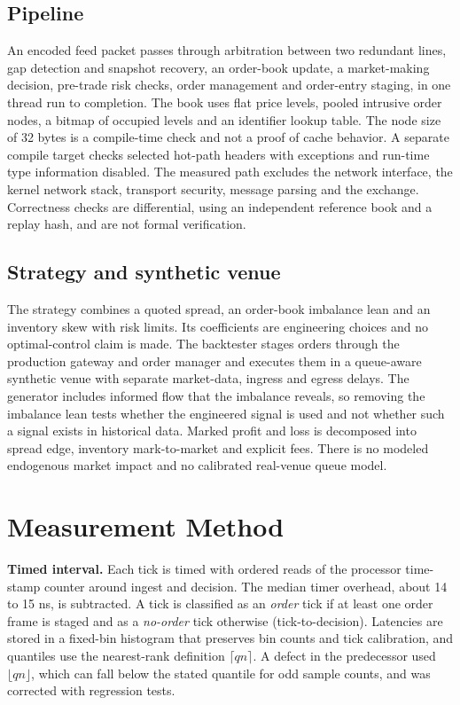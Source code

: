 \documentclass{ieeeaccess}
\begin{document}
\subsection{Pipeline}
An encoded feed packet passes through arbitration between two redundant lines, gap detection and snapshot recovery, an order-book update, a market-making decision, pre-trade risk checks, order management and order-entry staging, in one thread run to completion. The book uses flat price levels, pooled intrusive order nodes, a bitmap of occupied levels and an identifier lookup table. The node size of 32 bytes is a compile-time check and not a proof of cache behavior. A separate compile target checks selected hot-path headers with exceptions and run-time type information disabled. The measured path excludes the network interface, the kernel network stack, transport security, message parsing and the exchange. Correctness checks are differential, using an independent reference book and a replay hash, and are not formal verification.

\subsection{Strategy and synthetic venue}
The strategy combines a quoted spread, an order-book imbalance lean and an inventory skew with risk limits. Its coefficients are engineering choices and no optimal-control claim is made. The backtester stages orders through the production gateway and order manager and executes them in a queue-aware synthetic venue with separate market-data, ingress and egress delays. The generator includes informed flow that the imbalance reveals, so removing the imbalance lean tests whether the engineered signal is used and not whether such a signal exists in historical data. Marked profit and loss is decomposed into spread edge, inventory mark-to-market and explicit fees. There is no modeled endogenous market impact and no calibrated real-venue queue model.

\section{Measurement Method}
\label{sec:method}
\textbf{Timed interval.} Each tick is timed with ordered reads of the processor time-stamp counter around ingest and decision. The median timer overhead, about 14 to 15 ns, is subtracted. A tick is classified as an \emph{order} tick if at least one order frame is staged and as a \emph{no-order} tick otherwise (tick-to-decision). Latencies are stored in a fixed-bin histogram that preserves bin counts and tick calibration, and quantiles use the nearest-rank definition $\lceil qn\rceil$. A defect in the predecessor used $\lfloor qn\rfloor$, which can fall below the stated quantile for odd sample counts, and was corrected with regression tests.
\end{document}
